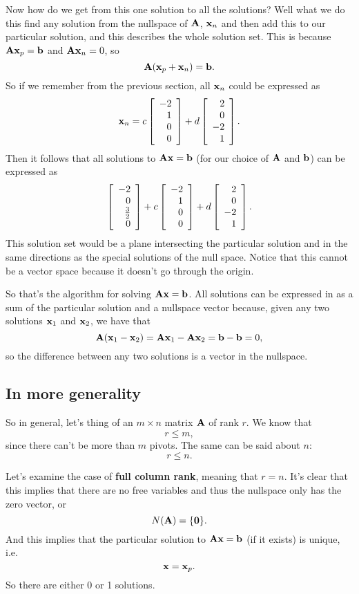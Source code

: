 Now how do we get from this one solution to all the solutions? Well what we do this find any solution from the nullspace of $\mA$, $\vx_n$ and then add this to our particular solution, and this describes the whole solution set. This is because $\mA\vx_p = \vb$ and $\mA\vx_n = 0$, so
\[ \mA(\vx_p + \vx_n) = \vb. \]
So if we remember from the previous section, all $\vx_n$ could be expressed as
\[ \vx_n = c\mat{-2\\1\\0\\0} + d\mat{2\\0\\-2\\1}. \]
Then it follows that all solutions to $\mA\vx = \vb$ (for our choice of $\mA$ and $\vb$) can be expressed as 
\[ \mat{-2\\0\\\frac 32\\0} + c\mat{-2\\1\\0\\0} + d\mat{2\\0\\-2\\1}. \]
This solution set would be a plane intersecting the particular solution and in the same directions as the special solutions of the null space. Notice that this cannot be a vector space because it doesn't go through the origin. 
\eex

So that's the algorithm for solving $\mA\vx = \vb$.
\brm
All solutions can be expressed in as a sum of the particular solution and a nullspace vector because, given any two solutions $\vx_1$ and $\vx_2$, we have that
\[ \mA(\vx_1-\vx_2) = \mA\vx_1 - \mA\vx_2 = \vb - \vb = 0, \]
so the difference between any two solutions is a vector in the nullspace.
\erm

\subsection{In more generality}

So in general, let's thing of an $m \times n$ matrix $\mA$ of rank $r$. We know that
\[ r \le m, \]
since there can't be more than $m$ pivots. The same can be said about $n$:
\[ r \le n. \]

Let's examine the case of \textbf{full column rank}, meaning that $r = n$. It's clear that this implies that there are no free variables and thus the nullspace only has the zero vector, or
\[ N(\mA) = \{\vct{0}\}. \]
And this implies that the particular solution to $\mA\vx = \vb$ (if it exists) is unique, i.e.
\[ \vx = \vx_p. \]
So there are either 0 or 1 solutions. 

